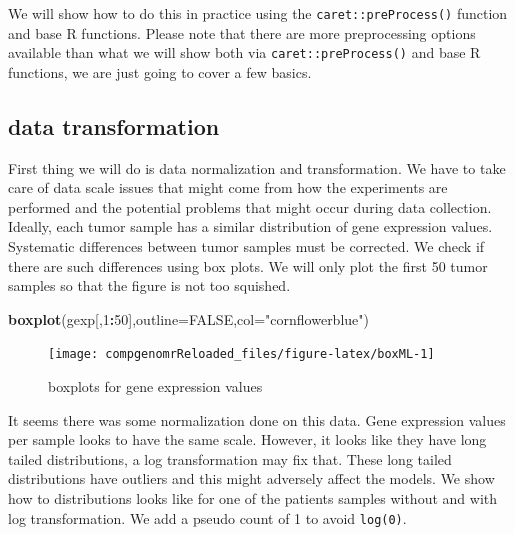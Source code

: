 \documentclass[12pt,]{krantz}
\newenvironment{Shaded}{\begin{snugshade}}{\end{snugshade}}
\newcommand{\DataTypeTok}[1]{\textcolor[rgb]{0.13,0.29,0.53}{#1}}
\newcommand{\DecValTok}[1]{\textcolor[rgb]{0.00,0.00,0.81}{#1}}
\newcommand{\KeywordTok}[1]{\textcolor[rgb]{0.13,0.29,0.53}{\textbf{#1}}}
\newcommand{\NormalTok}[1]{#1}
\newcommand{\OperatorTok}[1]{\textcolor[rgb]{0.81,0.36,0.00}{\textbf{#1}}}
\newcommand{\OtherTok}[1]{\textcolor[rgb]{0.56,0.35,0.01}{#1}}
\newcommand{\StringTok}[1]{\textcolor[rgb]{0.31,0.60,0.02}{#1}}
\begin{document}
We will show how to do this in practice using the \texttt{caret::preProcess()} function and base R functions. Please note that there are more preprocessing options available than what we will show both via \texttt{caret::preProcess()} and base R functions, we are just going to cover a few basics.

\hypertarget{data-transformation}{%
\subsection{data transformation}\label{data-transformation}}

First thing we will do is data normalization and transformation. We have to take care of data scale issues that might come from how the experiments are performed and the potential problems that might occur during data collection. Ideally, each tumor sample has a similar distribution of gene expression values. Systematic differences between tumor samples must be corrected. We check if there are such differences using box plots.
We will only plot the first 50 tumor samples so that the figure is not too
squished.

\begin{Shaded}
\begin{Highlighting}[]
\KeywordTok{boxplot}\NormalTok{(gexp[,}\DecValTok{1}\OperatorTok{:}\DecValTok{50}\NormalTok{],}\DataTypeTok{outline=}\OtherTok{FALSE}\NormalTok{,}\DataTypeTok{col=}\StringTok{"cornflowerblue"}\NormalTok{)}
\end{Highlighting}
\end{Shaded}

\begin{figure}

{\centering \texttt{[image: compgenomrReloaded\_files/figure-latex/boxML-1]} 

}

\caption{boxplots for gene expression values}\label{fig:boxML}
\end{figure}

It seems there was some normalization done on this data. Gene expression values per sample looks to have the same scale. However, it looks like they have long tailed distributions, a log transformation may fix that. These long tailed distributions have outliers and this might adversely affect the models. We show how to distributions looks like for one of the patients samples without and with log transformation. We add a pseudo count of 1 to avoid \texttt{log(0)}.
\end{document}
